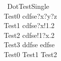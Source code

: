 \begin{circus}
  \circprocess\ DotTestSingle \circdef \circbegin \\
   Test0 \circdef cdfse?x?y?z \then \Skip \\
   Test1 \circdef cdfse?x!1.2 \then \Skip \\
   Test2 \circdef cdfse!1?x.2 \then \Skip \\
   Test3 \circdef ddfse \then edfse \then \Skip \\
	\circspot Test0 \circseq Test1 \circseq Test2 %
	\\
   \circend
\end{circus}

